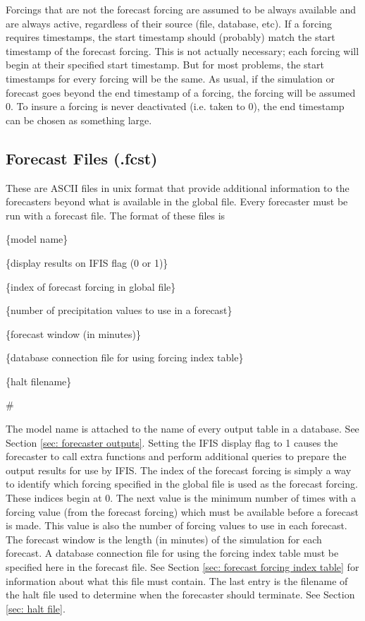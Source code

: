 \documentclass[12pt]{article}
\newenvironment{codeindent}
{\begin{list}{}
        {\setlength{\leftmargin}{.1in}}
        \item[]
}
{\end{list}}
\begin{document}
Forcings that are not the forecast forcing are assumed to be always available and are always active, regardless of their source (file, database, etc). If a forcing requires timestamps, the start timestamp should (probably) match the start timestamp of the forecast forcing. This is not actually necessary; each forcing will begin at their specified start timestamp. But for most problems, the start timestamps for every forcing will be the same. As usual, if the simulation or forecast goes beyond the end timestamp of a forcing, the forcing will be assumed 0. To insure a forcing is never deactivated (i.e. taken to 0), the end timestamp can be chosen as something large.

\subsection{Forecast Files (.fcst)} \label{sec: forecast files}

These are ASCII files in unix format that provide additional information to the forecasters beyond what is available in the global file. Every forecaster must be run with a forecast file. The format of these files is
\begin{codeindent}
\{model name\}

\{display results on IFIS flag (0 or 1)\}

\{index of forecast forcing in global file\}

\{number of precipitation values to use in a forecast\}

\{forecast window (in minutes)\}

\{database connection file for using forcing index table\}

\{halt filename\}

\#
\end{codeindent}
The model name is attached to the name of every output table in a database. See Section \ref{sec: forecaster outputs}. Setting the IFIS display flag to 1 causes the forecaster to call extra functions and perform additional queries to prepare the output results for use by IFIS. The index of the forecast forcing is simply a way to identify which forcing specified in the global file is used as the forecast forcing. These indices begin at 0. The next value is the minimum number of times with a forcing value (from the forecast forcing) which must be available before a forecast is made. This value is also the number of forcing values to use in each forecast. The forecast window is the length (in minutes) of the simulation for each forecast. A database connection file for using the forcing index table must be specified here in the forecast file. See Section \ref{sec: forecast forcing index table} for information about what this file must contain. The last entry is the filename of the halt file used to determine when the forecaster should terminate. See Section \ref{sec: halt file}.
\end{document}
